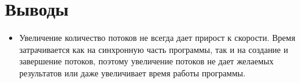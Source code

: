 \section{Выводы}
\begin{itemize}
\item Увеличение количество потоков не всегда дает прирост к скорости. Время затрачивается как на синхронную часть программы, так и на создание и завершение потоков, поэтому увеличение потоков не дает желаемых результатов или даже увеличивает время работы программы.
\end{itemize}
\pagebreak